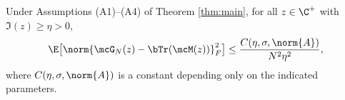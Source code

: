 \begin{theorem}\label{thm:convergence-rate}
Under Assumptions (A1)--(A4) of Theorem \ref{thm:main}, for all $z \in \C^+$ with $\Im(z) \geq \eta > 0$,
\[
\E\bigl[\norm{\mcG_N(z) - \bTr(\mcM(z))}^2_F\bigr] \leq \frac{C(\eta, \sigma, \norm{A})}{N^2 \eta^2},
\]
where $C(\eta, \sigma, \norm{A})$ is a constant depending only on the indicated parameters.
\end{theorem}
